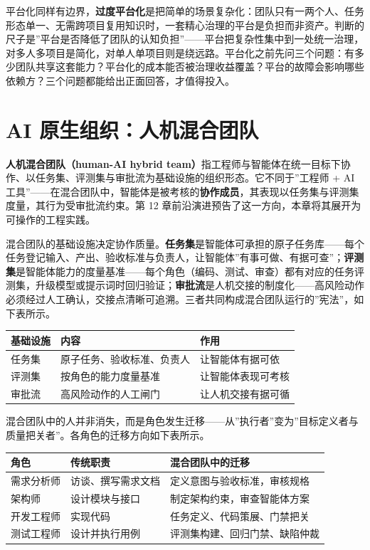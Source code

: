 \documentclass[12pt,a4paper,twoside,openany]{ctexbook}
\numberwithin{figure}{chapter}
\numberwithin{table}{chapter}
\newcounter{none}
\begin{document}
平台化同样有边界，\textbf{过度平台化}是把简单的场景复杂化：团队只有一两个人、任务形态单一、无需跨项目复用知识时，一套精心治理的平台是负担而非资产。判断的尺子是''平台是否降低了团队的认知负担''------平台把复杂性集中到一处统一治理，对多人多项目是简化，对单人单项目则是绕远路。平台化之前先问三个问题：有多少团队共享这套能力？平台化的成本能否被治理收益覆盖？平台的故障会影响哪些依赖方？三个问题都能给出正面回答，才值得投入。

\section{AI
原生组织：人机混合团队}\label{ai-ux539fux751fux7ec4ux7ec7ux4ebaux673aux6df7ux5408ux56e2ux961f}

\textbf{人机混合团队（human-AI hybrid
team）}指工程师与智能体在统一目标下协作、以任务集、评测集与审批流为基础设施的组织形态。它不同于''工程师
+ AI
工具''------在混合团队中，智能体是被考核的\textbf{协作成员}，其表现以任务集与评测集度量，其行为受审批流约束。第
12 章前沿演进预告了这一方向，本章将其展开为可操作的工程实践。

混合团队的基础设施决定协作质量。\textbf{任务集}是智能体可承担的原子任务库------每个任务登记输入、产出、验收标准与负责人，让智能体''有事可做、有据可查''；\textbf{评测集}是智能体能力的度量基准------每个角色（编码、测试、审查）都有对应的任务评测集，升级模型或提示词时回归验证；\textbf{审批流}是人机交接的制度化------高风险动作必须经过人工确认，交接点清晰可追溯。三者共同构成混合团队运行的''宪法''，如下表所示。

{\def\LTcaptype{none} %
\begin{longtable}[]{@{}lll@{}}
\toprule\noalign{}
基础设施 & 内容 & 作用 \\
\midrule\noalign{}
\endhead
\bottomrule\noalign{}
\endlastfoot
任务集 & 原子任务、验收标准、负责人 & 让智能体有据可依 \\
评测集 & 按角色的能力度量基准 & 让智能体表现可考核 \\
审批流 & 高风险动作的人工闸门 & 让人机交接有据可循 \\
\end{longtable}
}

混合团队中的人并非消失，而是角色发生迁移------从''执行者''变为''目标定义者与质量把关者''。各角色的迁移方向如下表所示。

{\def\LTcaptype{none} %
\begin{longtable}[]{@{}lll@{}}
\toprule\noalign{}
角色 & 传统职责 & 混合团队中的迁移 \\
\midrule\noalign{}
\endhead
\bottomrule\noalign{}
\endlastfoot
需求分析师 & 访谈、撰写需求文档 & 定义意图与验收标准，审核规格 \\
架构师 & 设计模块与接口 & 制定架构约束，审查智能体方案 \\
开发工程师 & 实现代码 & 任务定义、代码策展、门禁把关 \\
测试工程师 & 设计并执行用例 & 评测集构建、回归门禁、缺陷仲裁 \\
\end{longtable}
}
\end{document}
